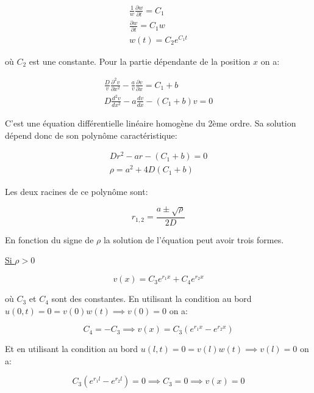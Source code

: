 \documentclass[a4paper, 12pt]{report}
\begin{document}
\begin{align}
\frac{1}{w} \frac{\partial w}{\partial t} = C_1\\
\frac{\partial w}{\partial t} = C_1 w\\
w(t) = C_{2} e^{C_1 t}
\end{align}

où $C_{2}$ est une constante. Pour la partie dépendante de la position $x$
on a:

\begin{align}
  \frac{D}{v} \frac{\partial^2v}{\partial x^2} - \frac{a}{v} \frac{\partial v}{\partial x} = C_1 + b\\
  D \frac{d^2v}{d x^2} - a \frac{d v}{d x} - (C_1 + b) v = 0
\end{align}

C'est une équation différentielle linéaire homogène du 2ème ordre. Sa solution
dépend donc de son polynôme caractéristique:

\begin{align}
  D r^2 - a r - (C_1 + b) = 0\\
  \rho = a^2 + 4 D (C_1 + b)
\end{align}

Les deux racines de ce polynôme sont:

\begin{equation}
   r_{1,2} = \frac{a \pm \sqrt{\rho}}{2 D}
 \end{equation}

En fonction du signe de $\rho$ la solution de l'équation peut avoir trois formes.

\underline{Si $\rho > 0$}

\begin{equation}
  v(x) = C_3 e^{r_1 x} + C_4 e^{r_2 x}
\end{equation}

où $C_3$ et $C_4$ sont des constantes. En utilisant la condition au bord
$u(0,t) = 0 = v(0) w(t) \implies v(0) = 0$ on a:

\begin{equation}
  C_4 = -C_3 \implies  v(x) = C_3 (e^{r_1 x} - e^{r_2 x})
\end{equation}

Et en utilisant la condition au bord $u(l,t) = 0 = v(l) w(t) \implies v(l) = 0$ on a:

\begin{equation}
  C_3 (e^{r_1 l} - e^{r_2 l}) = 0 \implies C_{3} = 0 \implies v(x) = 0
\end{equation}
\end{document}
